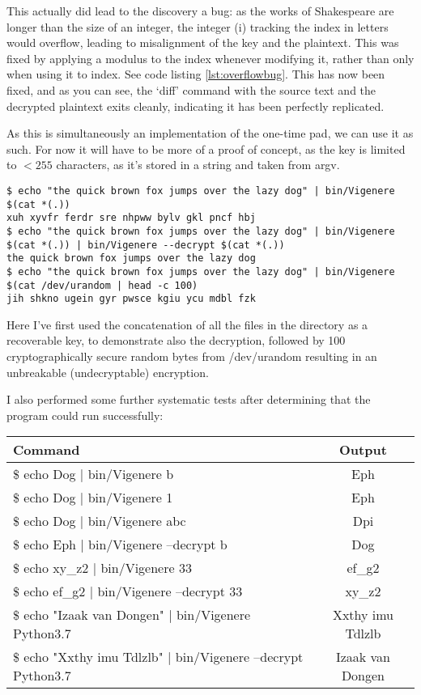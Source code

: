 \documentclass[fleqn,a4paper,11pt]{article}
\begin{document}
    This actually did lead to the discovery a bug: as the works of Shakespeare
    are longer than the size of an integer, the integer (i) tracking the index
    in letters would overflow, leading to misalignment of the key and the
    plaintext. This was fixed by applying a modulus to the index whenever
    modifying it, rather than only when using it to index. See code listing
    \ref{lst:overflowbug}. This has now been fixed, and as you can see, the
    `diff' command with the source text and the decrypted plaintext exits
    cleanly, indicating it has been perfectly replicated.

    As this is simultaneously an implementation of the one-time pad, we can use
    it as such. For now it will have to be more of a proof of concept, as the
    key is limited to \(< 255\) characters, as it's stored in a string and taken
    from argv.

\begin{lstlisting}[caption=Using the Vigen\`ere program for a one-time pad]
$ echo "the quick brown fox jumps over the lazy dog" | bin/Vigenere $(cat *(.))
xuh xyvfr ferdr sre nhpww bylv gkl pncf hbj
$ echo "the quick brown fox jumps over the lazy dog" | bin/Vigenere $(cat *(.)) | bin/Vigenere --decrypt $(cat *(.))
the quick brown fox jumps over the lazy dog
$ echo "the quick brown fox jumps over the lazy dog" | bin/Vigenere $(cat /dev/urandom | head -c 100)
jih shkno ugein gyr pwsce kgiu ycu mdbl fzk
\end{lstlisting}
\iffalse $ \fi %

    Here I've first used the concatenation of all the files in the directory as
    a recoverable key, to demonstrate also the decryption, followed by 100
    cryptographically secure random bytes from /dev/urandom resulting in an
    unbreakable (undecryptable) encryption.

    I also performed some further systematic tests after determining that the
    program could run successfully:

    \begin{tabular}{>{\ttfamily}l >{\ttfamily}c}
        \toprule
        Command & Output \\
        \midrule
        \$ echo Dog | bin/Vigenere b & Eph \\
        \$ echo Dog | bin/Vigenere 1 & Eph \\
        \$ echo Dog | bin/Vigenere abc & Dpi \\
        \$ echo Eph | bin/Vigenere --decrypt b & Dog \\
        \$ echo xy\_z2 | bin/Vigenere 33 & ef\_g2 \\
        \$ echo ef\_g2 | bin/Vigenere --decrypt 33 & xy\_z2 \\
        \$ echo "Izaak van Dongen" | bin/Vigenere Python3.7 & Xxthy imu Tdlzlb \\
        \$ echo "Xxthy imu Tdlzlb" | bin/Vigenere --decrypt Python3.7 & Izaak van Dongen \\
        \bottomrule
    \end{tabular}
\end{document}
